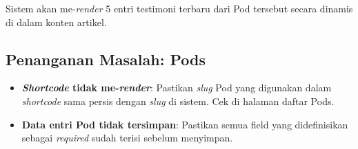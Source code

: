Sistem akan me-\textit{render} 5 entri testimoni terbaru dari Pod tersebut
secara dinamis di dalam konten artikel.

\subsection{Penanganan Masalah: Pods}

\begin{itemize}
  \item \textbf{\textit{Shortcode} tidak me-\textit{render}}:  Pastikan \textit{slug}
        Pod yang digunakan dalam \textit{shortcode} sama persis dengan \textit{slug}
        di sistem. Cek di halaman daftar Pods.
  \item \textbf{Data entri Pod tidak tersimpan}: Pastikan semua field yang
        didefinisikan sebagai \textit{required} sudah terisi sebelum menyimpan.
\end{itemize}

